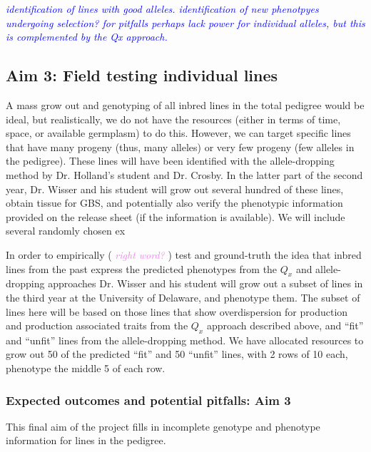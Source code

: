 \documentclass[12pt]{article}
\newcommand{\jri}[1]{\textcolor{blue}{ \emph{\scriptsize  #1}} }
\newcommand{\kc}[1]{\textcolor{violet}{ \emph{\scriptsize  #1}} }
\begin{document}
\jri{identification of lines with good alleles. identification of new phenotpyes undergoing selection? for pitfalls perhaps lack power for individual alleles, but this is complemented by the Qx approach.}



\subsection*{Aim 3: Field testing individual lines}
A mass grow out and genotyping of all inbred lines in the total pedigree would be ideal, but realistically, we do not have the resources (either in terms of time, space, or available germplasm) to do this.
However, we can target specific lines that have many progeny (thus, many alleles) or very few progeny (few alleles in the pedigree). These lines will have been identified with the allele-dropping method by Dr. Holland's student and Dr. Crosby. 
In the latter part of the second year, Dr. Wisser and his student will grow out several hundred of these lines, obtain tissue for GBS, and potentially also verify the phenotypic information provided on the release sheet (if the information is available). We will include several randomly chosen ex

In order to empirically (\kc{right word?}) test and ground-truth the idea that inbred lines from the past express the predicted phenotypes from the $Q_{x}$ and allele-dropping approaches Dr. Wisser and his student will grow out a subset of lines in the third year at the University of Delaware, and phenotype them.
The subset of lines here will be based on those lines that show overdispersion for production and production associated traits from the $Q_{x}$ approach described above, and ``fit'' and ``unfit'' lines from the allele-dropping method.
We have allocated resources to grow out 50 of the predicted ``fit'' and 50 ``unfit'' lines, with 2 rows of 10 each, phenotype the middle 5 of each row. 




\subsubsection*{Expected outcomes and potential pitfalls: Aim 3}
This final aim of the project fills in incomplete genotype and phenotype information for lines in the pedigree.
\end{document}
